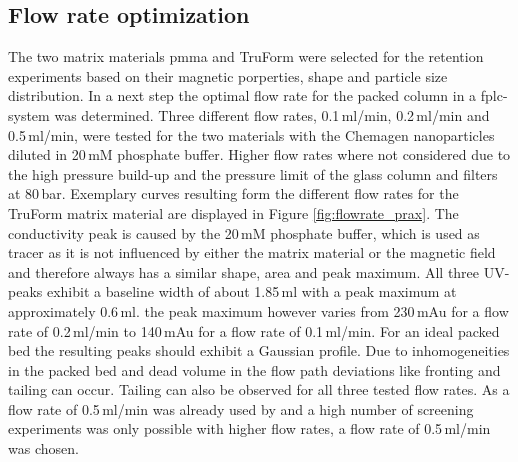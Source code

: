 % 
% 
% 


\subsection{Flow rate optimization}
\label{subsec:flow_rate_res}

The two matrix materials \gls{pmma} and TruForm were selected for the retention experiments based on their magnetic porperties, shape and particle size distribution. In a next step the optimal flow rate for the packed column in a \gls{fplc}-system was determined. Three different flow rates, 0.1\,ml/min, 0.2\,ml/min and 0.5\,ml/min, were tested for the two materials with the Chemagen nanoparticles diluted in 20\,mM phosphate buffer. Higher flow rates where not considered due to the high pressure build-up and the pressure limit of the glass column and filters at 80\,bar. Exemplary curves resulting form the different flow rates for the TruForm matrix material are displayed in Figure \ref{fig:flowrate_prax}. The conductivity peak is caused by the 20\,mM phosphate buffer, which is used as tracer as it is not influenced by either the matrix material or the magnetic field and therefore always has a similar shape, area and peak maximum. All three UV-peaks exhibit a baseline width of about 1.85\,ml with a peak maximum at approximately 0.6\,ml. the peak maximum however varies from 230\,mAu for a flow rate of 0.2\,ml/min to 140\,mAu for a flow rate of 0.1\,ml/min. 
For an ideal packed bed the resulting peaks should exhibit a Gaussian profile. Due to inhomogeneities in the packed bed and dead volume in the flow path deviations like fronting and tailing can occur. Tailing can also be observed for all three tested flow rates. As a flow rate of 0.5\,ml/min was already used by \cite{AndreMaster} and a high number of screening experiments was only possible with higher flow rates, a flow rate of 0.5\,ml/min was chosen.         

